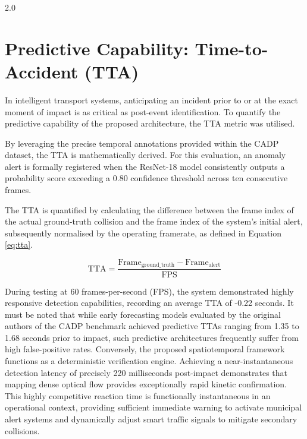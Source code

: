 \begin{spacing}{2.0}
\section{Predictive Capability: Time-to-Accident (TTA)}
In intelligent transport systems, anticipating an incident prior to or at the exact moment of impact is as critical as post-event identification. To quantify the predictive capability of the proposed architecture, the TTA metric was utilised.

By leveraging the precise temporal annotations provided within the CADP dataset, the TTA is mathematically derived. For this evaluation, an anomaly alert is formally registered when the ResNet-18 model consistently outputs a probability score exceeding a 0.80 confidence threshold across ten consecutive frames.

The TTA is quantified by calculating the difference between the frame index of the actual ground-truth collision and the frame index of the system’s initial alert, subsequently normalised by the operating framerate, as defined in Equation \ref{eq:tta}.

\begin{equation}
\text{TTA} = \frac{\text{Frame}_{\text{ground\_truth}} - \text{Frame}_{\text{alert}}}{\text{FPS}}
\label{eq:tta}
\end{equation}

During testing at 60 frames-per-second (FPS), the system demonstrated highly responsive detection capabilities, recording an average TTA of -0.22 seconds. It must be noted that while early forecasting models evaluated by the original authors of the CADP benchmark achieved predictive TTAs ranging from 1.35 to 1.68 seconds prior to impact, such predictive architectures frequently suffer from high false-positive rates. Conversely, the proposed spatiotemporal framework functions as a deterministic verification engine. Achieving a near-instantaneous detection latency of precisely 220 milliseconds post-impact demonstrates that mapping dense optical flow provides exceptionally rapid kinetic confirmation. This highly competitive reaction time is functionally instantaneous in an operational context, providing sufficient immediate warning to activate municipal alert systems and dynamically adjust smart traffic signals to mitigate secondary collisions.


\end{spacing}
